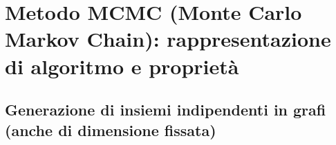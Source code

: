 \documentclass[\main/main.tex]{subfiles}
\begin{document}
\section{Metodo MCMC (Monte Carlo Markov Chain): rappresentazione di algoritmo e proprietà}
\subsection{Generazione di insiemi indipendenti in grafi (anche di dimensione fissata)}
\end{document}
